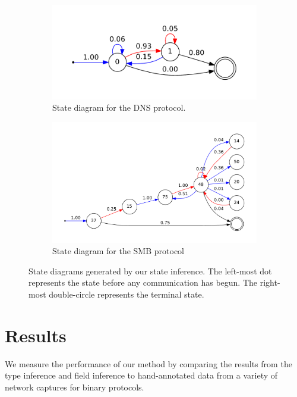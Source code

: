 \documentclass[a4paper]{report}
\begin{document}
\begin{figure}[h]
    \centering
    \begin{subfigure}[b]{0.48\textwidth}
        \includegraphics[width=\textwidth]{dnsstate}
        \caption{State diagram for the DNS protocol.}
        \label{fig:dnsstate}
    \end{subfigure}
    \quad
    \begin{subfigure}[b]{0.48\textwidth}
        \includegraphics[width=\textwidth]{smbstate}
        \caption{State diagram for the SMB protocol}
        \label{fig:smbstate}
    \end{subfigure}
    \caption{State diagrams generated by our state inference. The left-most
        dot represents the state before any communication has begun. The
        right-most double-circle represents the terminal state.}
    \label{fig:states}
\end{figure}

\chapter{Results}
We measure the performance of our method by comparing the results from the
type inference and field inference to hand-annotated data from a variety of
network captures for binary protocols.
\end{document}
